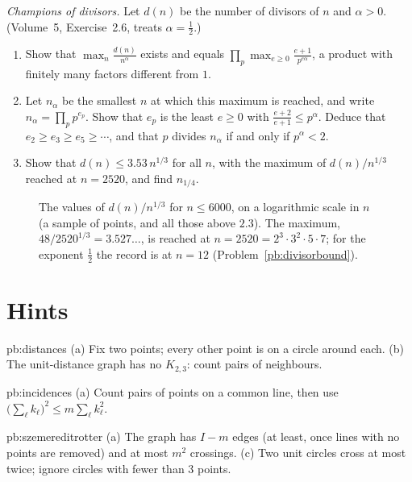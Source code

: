 \begin{exercise}[$\star\star$]\label{pb:divisorbound}
\emph{Champions of divisors.} Let $d(n)$ be the number of divisors of $n$ and $\alpha>0$. (Volume~5, Exercise~2.6, treats $\alpha=\frac12$.)
\begin{enumerate}[label=(\alph*)]
\item Show that $\max_n\frac{d(n)}{n^\alpha}$ exists and equals $\prod_p\max_{e\ge0}\frac{e+1}{p^{e\alpha}}$, a product with finitely many factors
different from $1$.
\item Let $n_\alpha$ be the smallest $n$ at which this maximum is reached, and write $n_\alpha=\prod_pp^{e_p}$. Show that $e_p$ is the least
$e\ge0$ with $\frac{e+2}{e+1}\le p^\alpha$. Deduce that $e_2\ge e_3\ge e_5\ge\cdots$, and that $p$ divides $n_\alpha$ if and only if $p^\alpha<2$.
\item Show that $d(n)\le3.53\,n^{1/3}$ for all $n$, with the maximum of $d(n)/n^{1/3}$ reached at $n=2520$, and find $n_{1/4}$.
\end{enumerate}
\end{exercise}

\begin{figure}[ht]
\centering
{}
\caption{The values of $d(n)/n^{1/3}$ for $n\le6000$, on a logarithmic scale in $n$ (a sample of points, and all those above $2.3$). The
maximum, $48/2520^{1/3}=3.527\ldots$, is reached at $n=2520=2^3\cdot3^2\cdot5\cdot7$; for the exponent $\frac12$ the record is at $n=12$
(Problem~\ref{pb:divisorbound}).}
\label{fig:divisors}
\end{figure}

\section{Hints}

\begin{hint}{pb:distances}
(a) Fix two points; every other point is on a circle around each. (b) The unit-distance graph has no $K_{2,3}$: count pairs of
neighbours.
\end{hint}

\begin{hint}{pb:incidences}
(a) Count pairs of points on a common line, then use $\bigl(\sum_\ell k_\ell\bigr)^2\le m\sum_\ell k_\ell^2$.
\end{hint}

\begin{hint}{pb:szemereditrotter}
(a) The graph has $I-m$ edges (at least, once lines with no points are removed) and at most $m^2$ crossings. (c) Two unit circles cross
at most twice; ignore circles with fewer than $3$ points.
\end{hint}

